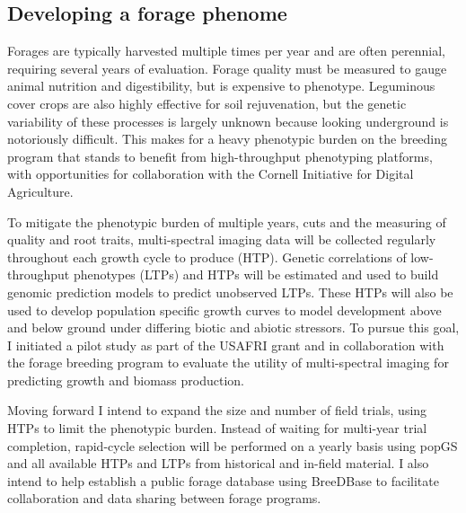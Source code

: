 \documentclass[11pt]{article}
\begin{document}
\subsection*{Developing a forage phenome}

Forages are typically harvested multiple times per year and are often perennial, requiring several years of evaluation. Forage quality must be measured to gauge animal nutrition and digestibility, but is expensive to phenotype. Leguminous cover crops are also highly effective for soil rejuvenation, but the genetic variability of these processes is largely unknown because looking underground is notoriously difficult. This makes for a heavy phenotypic burden on the breeding program that stands to benefit from high-throughput phenotyping platforms, with opportunities for collaboration with the Cornell Initiative for Digital Agriculture.

To mitigate the phenotypic burden of multiple years, cuts and the measuring of quality and root traits, multi-spectral imaging data will be collected regularly throughout each growth cycle to produce (HTP). Genetic correlations of low-throughput phenotypes (LTPs) and HTPs will be estimated and used to build genomic prediction models to predict unobserved LTPs. These HTPs will also be used to develop population specific growth curves to model development above and below ground under differing biotic and abiotic stressors. To pursue this goal, I initiated a pilot study as part of the USAFRI grant and in collaboration with the forage breeding program to evaluate the utility of multi-spectral imaging for predicting growth and biomass production.

Moving forward I intend to expand the size and number of field trials, using HTPs to limit the phenotypic burden. Instead of waiting for multi-year trial completion, rapid-cycle selection will be performed on a yearly basis using popGS and all available HTPs and LTPs from historical and in-field material. I also intend to help establish a public forage database using BreeDBase to facilitate collaboration and data sharing between forage programs.   %
\end{document}
